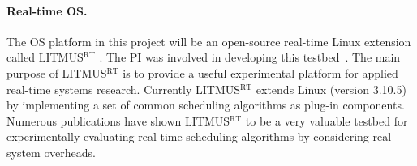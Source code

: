 \vspace{-2mm} \paragraph{Real-time OS.} The OS platform in this project will be an open-source real-time Linux extension called LITMUS$^{\textrm{RT}}$ \cite{LITMUS}. The PI was involved in developing this testbed~\cite{elliott1minimizing, Liudissertation}. The main purpose of LITMUS$^{\textrm{RT}}$ is to provide a useful experimental platform for applied real-time systems research. Currently LITMUS$^{\textrm{RT}}$ extends Linux (version 3.10.5) by implementing a set of common scheduling algorithms as plug-in components. Numerous  publications \cite{elliott1minimizing, elliott1minimizing, Liudissertation, BBBdissertation, clustered, calandrino2008cache, johndissertation} have shown LITMUS$^{\textrm{RT}}$ to be a very valuable testbed for experimentally evaluating real-time scheduling algorithms by considering real system overheads. 